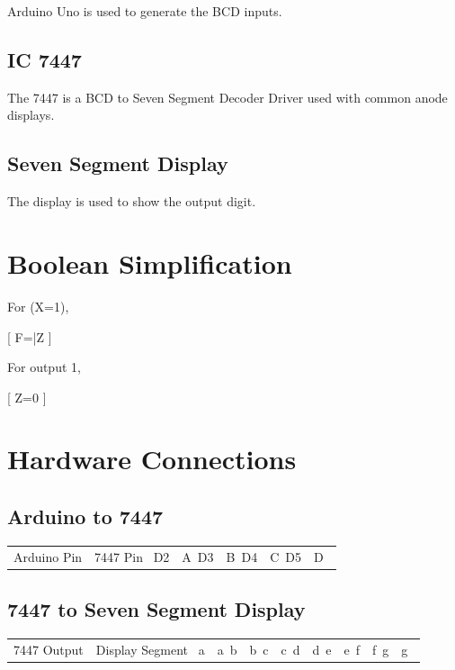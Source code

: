 \documentclass[a4paper,12pt]{article}
\begin{document}
Arduino Uno is used to generate the BCD inputs.

\subsection{IC 7447}

The 7447 is a BCD to Seven Segment Decoder Driver used with common anode displays.

\subsection{Seven Segment Display}

The display is used to show the output digit.

\section{Boolean Simplification}

For (X=1),

[
F=\bar{Z}
]

For output 1,

[
Z=0
]

\section{Hardware Connections}

\subsection{Arduino to 7447}

\begin{center}
\begin{tabular}{|c|c|}
\hline
Arduino Pin & 7447 Pin\
\hline
D2 & A\
D3 & B\
D4 & C\
D5 & D\
\hline
\end{tabular}
\end{center}

\subsection{7447 to Seven Segment Display}

\begin{center}
\begin{tabular}{|c|c|}
\hline
7447 Output & Display Segment\
\hline
a & a\
b & b\
c & c\
d & d\
e & e\
f & f\
g & g\
\hline
\end{tabular}
\end{center}
\end{document}
